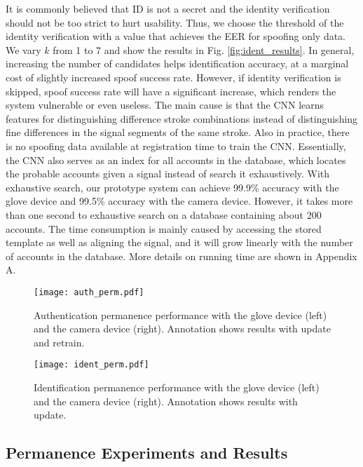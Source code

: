 \documentclass[conference]{IEEEtran}
\begin{document}
It is commonly believed that ID is not a secret and the identity verification should not be too strict to hurt usability. Thus, we choose the threshold of the identity verification with a value that achieves the EER for spoofing only data. We vary $k$ from 1 to 7 and show the results in Fig. \ref{fig:ident_results}. In general, increasing the number of candidates helps identification accuracy, at a marginal cost of slightly increased spoof success rate. However, if identity verification is skipped, spoof success rate will have a significant increase, which renders the system vulnerable or even useless. The main cause is that the CNN learns features for distinguishing difference stroke combinations instead of distinguishing fine differences in the signal segments of the same stroke. Also in practice, there is no spoofing data available at registration time to train the CNN. Essentially, the CNN also serves as an index for all accounts in the database, which locates the probable accounts given a signal instead of search it exhaustively. With exhaustive search, our prototype system can achieve 99.9\% accuracy with the glove device and 99.5\% accuracy with the camera device. However, it takes more than one second to exhaustive search on a database containing about 200 accounts. The time consumption is mainly caused by accessing the stored template as well as aligning the signal, and it will grow linearly with the number of accounts in the database. More details on running time are shown in Appendix A.

\begin{figure*}[t]
\centering
\texttt{[image: auth\_perm.pdf]}
\vspace{-4.0in}
\caption{Authentication permanence performance with the glove device (left) and the camera device (right). Annotation shows results with update and retrain.}
\label{fig:auth_permanence}
\end{figure*}


\begin{figure*}[t]
\centering
\texttt{[image: ident\_perm.pdf]}
\vspace{-4.0in}
\caption{Identification permanence performance with the glove device (left) and the camera device (right). Annotation shows results with update.}
\label{fig:ident_permanence}
\end{figure*}


\subsection{Permanence Experiments and Results}
\end{document}
